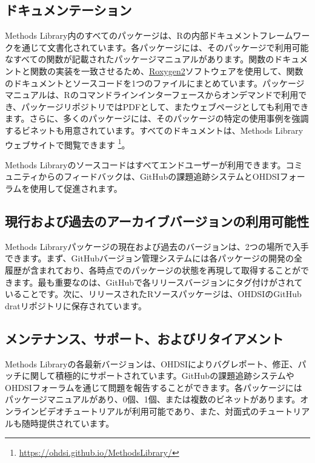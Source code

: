 \documentclass[
  11pt]{book}
\theoremstyle{definition}
\theoremstyle{definition}
\theoremstyle{definition}
\theoremstyle{definition}
\theoremstyle{remark}
\begin{document}
\subsection{ドキュメンテーション}\label{ux30c9ux30adux30e5ux30e1ux30f3ux30c6ux30fcux30b7ux30e7ux30f3}

Methods Library内のすべてのパッケージは、Rの内部ドキュメントフレームワークを通じて文書化されています。各パッケージには、そのパッケージで利用可能なすべての関数が記載されたパッケージマニュアルがあります。関数のドキュメントと関数の実装を一致させるため、\href{https://cran.r-project.org/web/packages/roxygen2/vignettes/roxygen2.html}{Roxygen2}ソフトウェアを使用して、関数のドキュメントとソースコードを1つのファイルにまとめています。パッケージマニュアルは、Rのコマンドラインインターフェースからオンデマンドで利用でき、パッケージリポジトリではPDFとして、またウェブページとしても利用できます。さらに、多くのパッケージには、そのパッケージの特定の使用事例を強調するビネットも用意されています。すべてのドキュメントは、Methods Libraryウェブサイトで閲覧できます \footnote{\url{https://ohdsi.github.io/MethodsLibrary/}}。

Methods Libraryのソースコードはすべてエンドユーザーが利用できます。コミュニティからのフィードバックは、GitHubの課題追跡システムとOHDSIフォーラムを使用して促進されます。

\subsection{現行および過去のアーカイブバージョンの利用可能性}\label{ux73feux884cux304aux3088ux3073ux904eux53bbux306eux30a2ux30fcux30abux30a4ux30d6ux30d0ux30fcux30b8ux30e7ux30f3ux306eux5229ux7528ux53efux80fdux6027}

Methods Libraryパッケージの現在および過去のバージョンは、2つの場所で入手できます。まず、GitHubバージョン管理システムには各パッケージの開発の全履歴が含まれており、各時点でのパッケージの状態を再現して取得することができます。最も重要なのは、GitHubで各リリースバージョンにタグ付けがされていることです。次に、リリースされたRソースパッケージは、OHDSIのGitHub dratリポジトリに保存されています。

\subsection{メンテナンス、サポート、およびリタイアメント}\label{ux30e1ux30f3ux30c6ux30caux30f3ux30b9ux30b5ux30ddux30fcux30c8ux304aux3088ux3073ux30eaux30bfux30a4ux30a2ux30e1ux30f3ux30c8}

Methods Libraryの各最新バージョンは、OHDSIによりバグレポート、修正、パッチに関して積極的にサポートされています。GitHubの課題追跡システムやOHDSIフォーラムを通じて問題を報告することができます。各パッケージにはパッケージマニュアルがあり、0個、1個、または複数のビネットがあります。オンラインビデオチュートリアルが利用可能であり、また、対面式のチュートリアルも随時提供されています。
\end{document}
